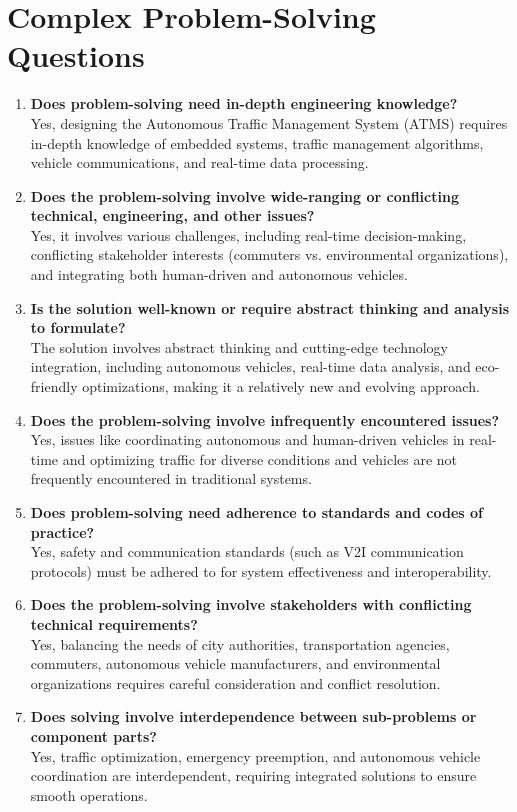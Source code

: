 \documentclass{scrreprt}
\begin{document}
\section*{Complex Problem-Solving Questions}

\begin{enumerate}
    \item \textbf{Does problem-solving need in-depth engineering knowledge?} \\
    Yes, designing the Autonomous Traffic Management System (ATMS) requires in-depth knowledge of embedded systems, traffic management algorithms, vehicle communications, and real-time data processing.

    \item \textbf{Does the problem-solving involve wide-ranging or conflicting technical, engineering, and other issues?} \\
    Yes, it involves various challenges, including real-time decision-making, conflicting stakeholder interests (commuters vs. environmental organizations), and integrating both human-driven and autonomous vehicles.

    \item \textbf{Is the solution well-known or require abstract thinking and analysis to formulate?} \\
    The solution involves abstract thinking and cutting-edge technology integration, including autonomous vehicles, real-time data analysis, and eco-friendly optimizations, making it a relatively new and evolving approach.

    \item \textbf{Does the problem-solving involve infrequently encountered issues?} \\
    Yes, issues like coordinating autonomous and human-driven vehicles in real-time and optimizing traffic for diverse conditions and vehicles are not frequently encountered in traditional systems.

    \item \textbf{Does problem-solving need adherence to standards and codes of practice?} \\
    Yes, safety and communication standards (such as V2I communication protocols) must be adhered to for system effectiveness and interoperability.

    \item \textbf{Does the problem-solving involve stakeholders with conflicting technical requirements?} \\
    Yes, balancing the needs of city authorities, transportation agencies, commuters, autonomous vehicle manufacturers, and environmental organizations requires careful consideration and conflict resolution.

    \item \textbf{Does solving involve interdependence between sub-problems or component parts?} \\
    Yes, traffic optimization, emergency preemption, and autonomous vehicle coordination are interdependent, requiring integrated solutions to ensure smooth operations.
\end{enumerate}
\end{document}
